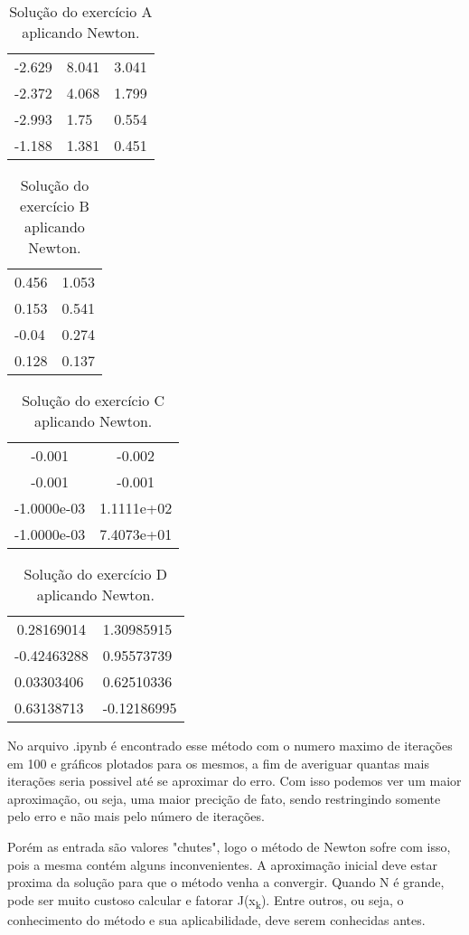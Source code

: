 \documentclass[12pt]{article}
\begin{document}
\begin{table}[!ht]
    \centering
\begin{tabular}{|lll|}
    \multicolumn{1}{|c}{-2.629} & 8.041 & 3.041 \\
-2.372                      & 4.068 & 1.799 \\
-2.993                      & 1.75  & 0.554 \\
-1.188                      & 1.381 & 0.451
\end{tabular}
    \caption{Solução do exercício A aplicando Newton.}
\end{table}

\begin{table}[!ht]
    \centering
\begin{tabular}{|ll|}
    \multicolumn{1}{|c}{0.456} & 1.053 \\
0.153                      & 0.541 \\
-0.04                      & 0.274 \\
0.128                      & 0.137
\end{tabular}
    \caption{Solução do exercício B aplicando Newton.}
\end{table}

\begin{table}[!h]
    \centering
    \begin{tabular}{|cc|}
-0.001      & -0.002     \\
-0.001      & -0.001     \\
-1.0000e-03 & 1.1111e+02 \\
-1.0000e-03 & 7.4073e+01
\end{tabular}
    \caption{Solução do exercício C aplicando Newton.}
\end{table}

\begin{table}[!h]
    \centering
\begin{tabular}{|ll|}
\multicolumn{1}{|c}{0.28169014} & 1.30985915  \\
-0.42463288                     & 0.95573739  \\
0.03303406                      & 0.62510336  \\
0.63138713                      & -0.12186995
\end{tabular}
    \caption{Solução do exercício D aplicando Newton.}
\end{table}

No arquivo .ipynb é encontrado esse método com o numero maximo de iterações em 100 e gráficos plotados para os mesmos, a fim de averiguar quantas mais iterações seria possivel até se aproximar do erro. Com isso podemos ver um maior aproximação, ou seja, uma maior precição de fato, sendo restringindo somente pelo erro e não mais pelo número de iterações.

Porém as entrada são valores "chutes", logo o método de Newton sofre com isso, pois a mesma contém alguns inconvenientes. A aproximação inicial deve estar proxima da solução para que o método venha a convergir. Quando N é grande, pode ser muito custoso calcular e fatorar J(x\textsubscript{k}). Entre outros, ou seja, o conhecimento do método e sua aplicabilidade, deve serem conhecidas antes.
\end{document}
